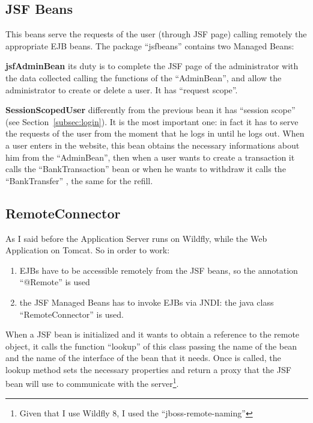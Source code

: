 \documentclass[a4paper]{article}
\begin{document}
\subsection{JSF Beans}
This beans serve the requests of the user (through JSF page) calling remotely the appropriate EJB beans. The package ``jsfbeans'' contains two Managed Beans:
\begin{compactitem}
  \item \textbf{jsfAdminBean} its duty is to complete the JSF page of the administrator with the data collected calling the functions of the ``AdminBean'', and allow the administrator to create or delete a user. It has ``request scope''.
  \item \textbf{SessionScopedUser} differently from the previous bean it has ``session scope'' (see Section~\ref{subsec:login}). It is the most important one: in fact it has to serve the requests of the user from the moment that he logs in until he logs out.
  When a user enters in the website, this bean obtains the necessary informations about him from the ``AdminBean'', then when a user wants to create a transaction it calls the ``BankTransaction'' bean or when he wants to withdraw it calls the ``BankTransfer'' , the same for the refill.
\end{compactitem}

\subsection{RemoteConnector}
\label{subsec:rem_conn}
As I said before the Application Server runs on Wildfly, while the Web Application on Tomcat. So in order to work:
\begin{enumerate}
  \item EJBs have to be accessible remotely from the JSF beans, so the annotation ``@Remote'' is used
  \item the JSF Managed Beans has to invoke EJBs via JNDI: the java class ``RemoteConnector'' is used.
\end{enumerate}

When a JSF bean is initialized and it wants to obtain a reference to the remote object, it calls the function ``lookup'' of this class passing the name of the bean and the name of the interface of the bean that it needs. Once is called, the lookup method sets the necessary properties and return a proxy that the JSF bean will use to communicate with the server\footnote{Given that I use Wildfly 8, I used the ``jboss-remote-naming''\cite{remotejndi}}.
\end{document}
